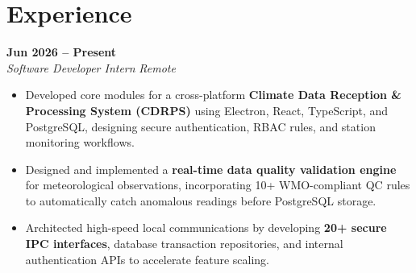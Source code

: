 \documentclass[a4paper,10pt]{article}
\begin{document}
\section*{Experience}
\begin{description}[leftmargin=!,labelwidth=0.5cm]

    \item[\textbf{Helionyex Solutions}] \hfill \textbf{Jun 2026 -- Present} \\
    \textit{Software Developer Intern} \hfill \textit{Remote}

    \begin{itemize}
        \item Developed core modules for a cross-platform \textbf{Climate Data Reception \& Processing System (CDRPS)} using Electron, React, TypeScript, and PostgreSQL, designing secure authentication, RBAC rules, and station monitoring workflows.
        \item Designed and implemented a \textbf{real-time data quality validation engine} for meteorological observations, incorporating 10+ WMO-compliant QC rules to automatically catch anomalous readings before PostgreSQL storage.
        \item Architected high-speed local communications by developing \textbf{20+ secure IPC interfaces}, database transaction repositories, and internal authentication APIs to accelerate feature scaling.
    \end{itemize}

\end{description}

\end{document}
